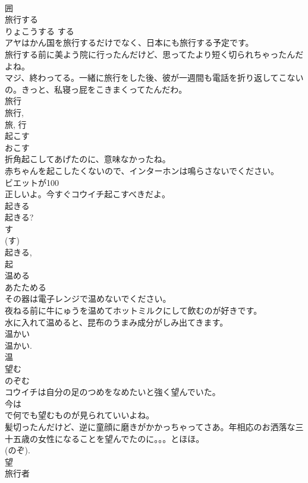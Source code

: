\documentclass[8pt]{extreport}
\begin{document}
\begin{CJK}{UTF8}{min}
\\	囲	
\\	旅行する	
\\	りょこうする	する 
\\	アヤはかん国を旅行するだけでなく、日本にも旅行する予定です。	
\\	旅行する前に美よう院に行ったんだけど、思ってたより短く切られちゃったんだよね。	
\\	マジ、終わってる。一緒に旅行をした後、彼が一週間も電話を折り返してこないの。きっと、私寝っ屁をこきまくってたんだわ。	
\\	旅行 
\\	旅行, 
\\	旅, 行	
\\	起こす	
\\	おこす	
\\	折角起こしてあげたのに、意味なかったね。	
\\	赤ちゃんを起こしたくないので、インターホンは鳴らさないでください。	
\\	ビエットが100
\\	正しいよ。今すぐコウイチ起こすべきだよ。	
\\	起きる 
\\	起きる? 
\\	す 
\\	(す) 
\\	起きる, 
\\	起	
\\	温める	
\\	あたためる	
\\	その器は電子レンジで温めないでください。	
\\	夜ねる前に牛にゅうを温めてホットミルクにして飲むのが好きです。	
\\	水に入れて温めると、昆布のうまみ成分がしみ出てきます。	
\\	温かい 
\\	温かい. 
\\	温	
\\	望む	
\\	のぞむ	
\\	コウイチは自分の足のつめをなめたいと強く望んでいた。	
\\	今は
\\	で何でも望むものが見られていいよね。	
\\	髪切ったんだけど、逆に童顔に磨きがかかっちゃってさあ。年相応のお洒落な三十五歳の女性になることを望んでたのに。。。とほほ。	
\\	(のぞ). 
\\	望	
\\	旅行者	

\end{CJK}
\end{document}
